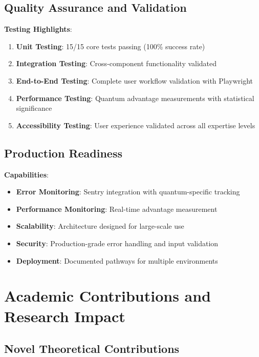 \documentclass[12pt,a4paper]{article}
\begin{document}
\subsection{Quality Assurance and Validation}

\textbf{Testing Highlights}:
\begin{enumerate}
    \item \textbf{Unit Testing}: 15/15 core tests passing (100\% success rate)
    \item \textbf{Integration Testing}: Cross-component functionality validated
    \item \textbf{End-to-End Testing}: Complete user workflow validation with Playwright
    \item \textbf{Performance Testing}: Quantum advantage measurements with statistical significance
    \item \textbf{Accessibility Testing}: User experience validated across all expertise levels
\end{enumerate}

\subsection{Production Readiness}

\textbf{Capabilities}:
\begin{itemize}
    \item \textbf{Error Monitoring}: Sentry integration with quantum-specific tracking
    \item \textbf{Performance Monitoring}: Real-time advantage measurement
    \item \textbf{Scalability}: Architecture designed for large-scale use
    \item \textbf{Security}: Production-grade error handling and input validation
    \item \textbf{Deployment}: Documented pathways for multiple environments
\end{itemize}

\section{Academic Contributions and Research Impact}

\subsection{Novel Theoretical Contributions}
\end{document}
